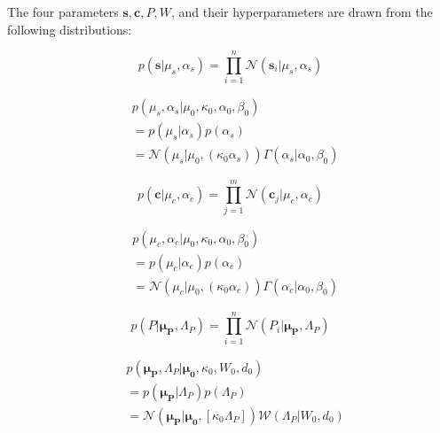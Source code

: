 \documentclass[10pt]{proc}
\begin{document}
The four parameters $\bm{s}, \bm{c}, P, W$, and their hyperparameters are drawn
from the following distributions:

\begin{equation}
    p(\bm{s} | \mu_s, \alpha_s) =
        \prod_{i=1}^n \mathcal{N}(\bm{s}_i | \mu_s, \alpha_s)
\end{equation}

\begin{equation}
\begin{aligned}
    &p(\mu_s, \alpha_s | \mu_0, \kappa_0, \alpha_0, \beta_0) \\
        & = p(\mu_s | \alpha_s) p(\alpha_s) \\
        & = \mathcal{N}(\mu_s | \mu_0, (\kappa_0 \alpha_s))
            \Gamma(\alpha_s | \alpha_0, \beta_0)
\end{aligned}
\end{equation}

\begin{equation}
    p(\bm{c} | \mu_c, \alpha_c) =
        \prod_{j=1}^m \mathcal{N}(\bm{c}_j | \mu_c, \alpha_c)
\end{equation}

\begin{equation}
\begin{aligned}
    &p(\mu_c, \alpha_c | \mu_0, \kappa_0, \alpha_0, \beta_0) \\
        & = p(\mu_c | \alpha_c) p (\alpha_c) \\
        & = \mathcal{N}(\mu_c | \mu_0, (\kappa_0 \alpha_c))
            \Gamma(\alpha_c | \alpha_0, \beta_0)
\end{aligned}
\end{equation}

\begin{equation}
    p(P | \bm{\mu_P}, \Lambda_P) =
        \prod_{i=1}^n \mathcal{N}(P_i | \bm{\mu_P}, \Lambda_P)
\end{equation}

\begin{equation}
\begin{aligned}
    &p(\bm{\mu_P}, \Lambda_P | \bm{\mu_0}, \kappa_0, W_0, d_0) \\
        & = p(\bm{\mu_P} | \Lambda_P) p(\Lambda_P) \\
        & = \mathcal{N}(\bm{\mu_P} | \bm{\mu_0}, [\kappa_0 \Lambda_P])
            \mathcal{W}(\Lambda_P | W_0, d_0)
\end{aligned}
\end{equation}
\end{document}
